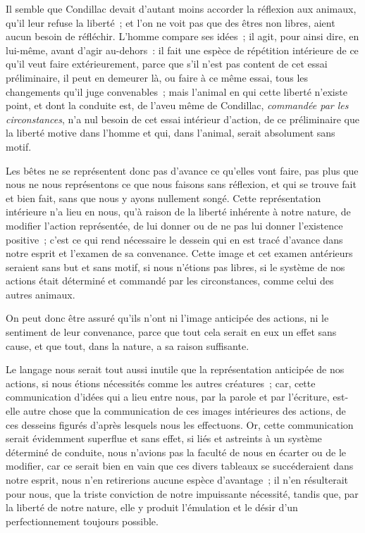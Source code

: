 \documentclass[french,twoside]{book} %
\begin{document}
Il semble que Condillac devait d’autant moins accorder la réflexion aux animaux, qu’il leur refuse la liberté ; et l’on ne voit pas que des êtres non libres, aient aucun besoin de réfléchir. L’homme compare ses idées ; il agit, pour ainsi dire, en lui-même, avant d’agir au-dehors : il fait une espèce de répétition intérieure de ce qu’il veut faire extérieurement, parce que s’il n’est pas content de cet essai préliminaire, il peut en demeurer là, ou faire à ce même essai, tous les changements qu’il juge convenables ; mais l’animal en qui cette liberté n’existe point, et dont la conduite est, de l’aveu même de Condillac, {\itshape commandée par les circonstances}, n’a nul besoin de cet essai intérieur d’action, de ce préliminaire que la liberté motive dans l’homme et qui, dans l’animal, serait absolument sans motif.\par
Les bêtes ne se représentent donc pas d’avance ce qu’elles vont faire, pas plus que nous ne nous représentons ce que nous faisons sans réflexion, et qui se trouve fait et bien fait, sans que nous y ayons nullement songé. Cette représentation intérieure n’a lieu en nous, qu’à raison de la liberté inhérente à notre nature, de modifier l’action représentée, de lui donner ou de ne pas lui donner l’existence positive ; c’est ce qui rend nécessaire le dessein qui en est tracé d’avance dans notre esprit et l’examen de sa convenance. Cette image et cet examen antérieurs seraient sans but et sans motif, si nous n’étions pas libres, si le système de nos actions était déterminé et commandé par les circonstances, comme celui des autres animaux.\par
On peut donc être assuré qu’ils n’ont ni l’image anticipée des actions, ni le sentiment de leur convenance, parce que tout cela serait en eux un effet sans cause, et que tout, dans la nature, a sa raison suffisante.\par
Le langage nous serait tout aussi inutile que la représentation anticipée de nos actions, si nous étions nécessités comme les autres créatures ; car, cette communication d’idées qui a lieu entre nous, par la parole et par l’écriture, est-elle autre chose que la communication de ces images intérieures des actions, de ces desseins figurés d’après lesquels nous les effectuons. Or, cette communication serait évidemment superflue et sans effet, si liés et astreints à un système déterminé de conduite, nous n’avions pas la faculté de nous en écarter ou de le modifier, car ce serait bien en vain que ces divers tableaux se succéderaient dans notre esprit, nous n’en retirerions aucune espèce d’avantage ; il n’en résulterait pour nous, que la triste conviction de notre impuissante nécessité, tandis que, par la liberté de notre nature, elle y produit l’émulation et le désir d’un perfectionnement toujours possible.\par
\end{document}
